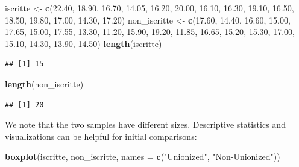 \documentclass[
]{article}
\newenvironment{Shaded}{\begin{snugshade}}{\end{snugshade}}
\newcommand{\AttributeTok}[1]{\textcolor[rgb]{0.13,0.29,0.53}{#1}}
\newcommand{\FloatTok}[1]{\textcolor[rgb]{0.00,0.00,0.81}{#1}}
\newcommand{\FunctionTok}[1]{\textcolor[rgb]{0.13,0.29,0.53}{\textbf{#1}}}
\newcommand{\NormalTok}[1]{#1}
\newcommand{\OtherTok}[1]{\textcolor[rgb]{0.56,0.35,0.01}{#1}}
\newcommand{\StringTok}[1]{\textcolor[rgb]{0.31,0.60,0.02}{#1}}
\begin{document}
\begin{Shaded}
\begin{Highlighting}[]
\NormalTok{iscritte }\OtherTok{\textless{}{-}} \FunctionTok{c}\NormalTok{(}\FloatTok{22.40}\NormalTok{, }\FloatTok{18.90}\NormalTok{, }\FloatTok{16.70}\NormalTok{, }\FloatTok{14.05}\NormalTok{, }\FloatTok{16.20}\NormalTok{, }\FloatTok{20.00}\NormalTok{, }\FloatTok{16.10}\NormalTok{, }\FloatTok{16.30}\NormalTok{, }\FloatTok{19.10}\NormalTok{, }\FloatTok{16.50}\NormalTok{, }\FloatTok{18.50}\NormalTok{, }\FloatTok{19.80}\NormalTok{, }\FloatTok{17.00}\NormalTok{, }\FloatTok{14.30}\NormalTok{, }\FloatTok{17.20}\NormalTok{)}
\NormalTok{non\_iscritte }\OtherTok{\textless{}{-}} \FunctionTok{c}\NormalTok{(}\FloatTok{17.60}\NormalTok{, }\FloatTok{14.40}\NormalTok{, }\FloatTok{16.60}\NormalTok{, }\FloatTok{15.00}\NormalTok{, }\FloatTok{17.65}\NormalTok{, }\FloatTok{15.00}\NormalTok{, }\FloatTok{17.55}\NormalTok{, }\FloatTok{13.30}\NormalTok{, }\FloatTok{11.20}\NormalTok{, }\FloatTok{15.90}\NormalTok{, }\FloatTok{19.20}\NormalTok{, }\FloatTok{11.85}\NormalTok{, }\FloatTok{16.65}\NormalTok{, }\FloatTok{15.20}\NormalTok{, }\FloatTok{15.30}\NormalTok{, }\FloatTok{17.00}\NormalTok{, }\FloatTok{15.10}\NormalTok{, }\FloatTok{14.30}\NormalTok{, }\FloatTok{13.90}\NormalTok{, }\FloatTok{14.50}\NormalTok{)}
\FunctionTok{length}\NormalTok{(iscritte)}
\end{Highlighting}
\end{Shaded}

\begin{verbatim}
## [1] 15
\end{verbatim}

\begin{Shaded}
\begin{Highlighting}[]
\FunctionTok{length}\NormalTok{(non\_iscritte)}
\end{Highlighting}
\end{Shaded}

\begin{verbatim}
## [1] 20
\end{verbatim}

We note that the two samples have different sizes. Descriptive
statistics and visualizations can be helpful for initial comparisons:

\begin{Shaded}
\begin{Highlighting}[]
\FunctionTok{boxplot}\NormalTok{(iscritte, non\_iscritte, }\AttributeTok{names =} \FunctionTok{c}\NormalTok{(}\StringTok{"Unionized"}\NormalTok{, }\StringTok{"Non{-}Unionized"}\NormalTok{))}
\end{Highlighting}
\end{Shaded}
\end{document}
